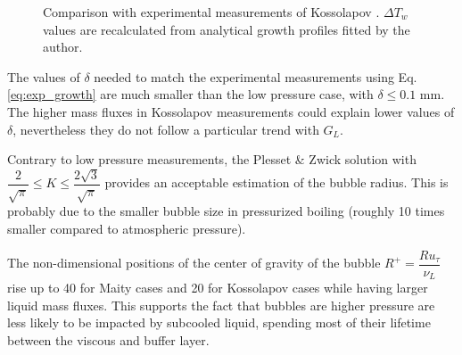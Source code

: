\begin{figure}[h!]
\begin{center}


	\caption{Comparison with experimental measurements of Kossolapov \cite{kossolapov_experimental_2021}. $\Delta T_{w}$ values are recalculated from analytical growth profiles fitted by the author.}
	\label{fig:comp_growth_koss}
\end{center}
\end{figure}


The values of $\delta$ needed to match the experimental measurements using Eq. \ref{eq:exp_growth} are much smaller than the low pressure case, with $\delta \leq 0.1$ mm. The higher mass fluxes in Kossolapov measurements could explain lower values of $\delta$, nevertheless they do not follow a particular trend with $G_{L}$.

\npar

Contrary to low pressure measurements, the Plesset \& Zwick solution with $\dfrac{2}{\sqrt{\pi}} \leq K \leq \dfrac{2\sqrt{3}}{\sqrt{\pi}}$ provides an acceptable estimation of the bubble radius. This is probably due to the smaller bubble size in pressurized boiling (roughly 10 times smaller compared to atmospheric pressure). 

\begin{remark*}{}
The non-dimensional positions of the center of gravity of the bubble $R^{+}=\dfrac{R u_{\tau}}{\nu_{L}}$ rise up to 40 for Maity cases and 20 for Kossolapov cases while having larger liquid mass fluxes. This supports the fact that bubbles are higher pressure are less likely to be impacted by subcooled liquid, spending most of their lifetime between the viscous and buffer layer.
\end{remark*}


